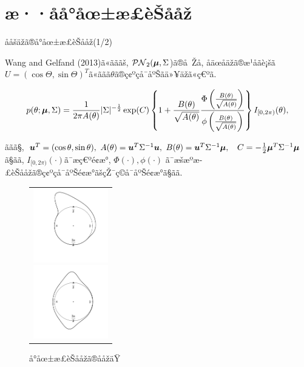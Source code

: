 \documentclass[dvipdfmx]{beamer} %
\newcommand{\bm}[1]{\mbox{\boldmath $#1$}}
\begin{document}
\section{æ··åå°åœ±æ­£èŠååž}
\begin{frame}{ååšäžã®å°åœ±æ­£èŠååž(1/2)}

Wang and Gelfand (2013)ã«ãããš, $\mathcal{PN}_2(\bm \mu,\Sigma$)ã®å Žå, åäœåäžã®æ¹åãè¡šã$U = (\cos\Theta, \sin\Theta)^T$ã«ããã$\theta$ã®ç¢ºçå¯åºŠãä»¥äžã«ç€ºã.

\vspace{-0.2cm}
\small
\begin{eqnarray*}
\label{PNC}
p(\theta; \bm \mu, \Sigma) = \frac{1}{2\pi A(\theta)}|\Sigma|^{-\frac{1}{2}}
\exp(C)\left\{1 + \frac{B(\theta)}{\sqrt{A(\theta)}} \frac{\Phi \left(\frac{B(\theta)}{\sqrt{A(\theta)}}\right)}{\phi \left(\frac{B(\theta)}{\sqrt{A(\theta)}}\right)}\right\} I_{[0,2\pi)}(\theta),
\end{eqnarray*}
\normalsize

\noindent
ããã§, $\bm u^T = (\cos\theta,\sin\theta), \ A(\theta) = \bm u^T\Sigma^{-1}\bm u, \ B(\theta) = \bm u^T \Sigma^{-1} \bm \mu,$
$\ C = -\frac{1}{2} \bm \mu^T \Sigma^{-1} \bm \mu$ã§ãã, $I_{[0,2\pi)} (\cdot)$ã¯æç€ºé¢æ°, $\Phi(\cdot), \phi(\cdot)$ ã¯æšæºæ­£èŠååžã®ç¢ºçå¯åºŠé¢æ°ãšçŽ¯ç©å¯åºŠé¢æ°ã§ãã.

\begin{figure}[H]
 \begin{tabular}{c}
 \begin{minipage}{0.5\hsize}
  \begin{center}
   \includegraphics[clip,height= 32mm]{data/sample_asymmetry.png}
  \end{center}
 \end{minipage}
 \hspace{-2.0cm}
 \begin{minipage}{0.5\hsize}
  \begin{center}
 \includegraphics[clip,height= 32mm]{data/sample_bimodal.png}
  \end{center}
 \end{minipage}
\end{tabular}
\vspace{-0.2cm}
\caption{å°åœ±æ­£èŠååžã®ååžäŸ}
\end{figure}

\end{frame}
\end{document}
